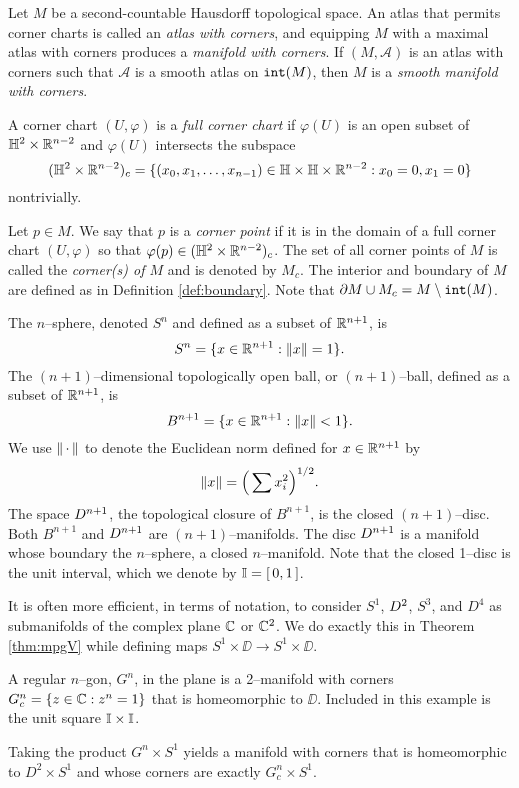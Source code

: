 \begin{defn}
	Let $M$ be a second-countable Hausdorff topological space.
	An atlas that permits corner charts is called an \emph{atlas with corners}, and equipping $M$ with a maximal atlas with corners produces a \emph{manifold with corners}.
	If $(M,\mathcal{A})$ is an atlas with corners such that $\mathcal{A}$ is a smooth atlas on $\mathtt{int}(M)$, then $M$ is a \emph{smooth manifold with corners}.
	
	A corner chart $(U,\varphi)$ is a \emph{full corner chart} if $\varphi(U)$ is an open subset of $\mathbb{H}^2\times\mathbb{R}^{n-2}$ and $\varphi(U)$ intersects the subspace 
	\[
		(\mathbb{H}^2\times\mathbb{R}^{n-2})_c = \{(x_0,x_1,\dots,x_{n-1})\in\mathbb{H}\times\mathbb{H}\times\mathbb{R}^{n-2}:x_0=0,x_1=0\}
	\]
	nontrivially.
	
	Let $p\in M$.
	We say that $p$ is a \emph{corner point} if it is in the domain of a full corner chart $(U,\varphi)$ so that $\varphi(p)\in(\mathbb{H}^2\times\mathbb{R}^{n-2})_c$.
	The set of all corner points of $M$ is called the \emph{corner(s) of $M$} and is denoted by $M_c$.
	The interior and boundary of $M$ are defined as in Definition \ref{def:boundary}.
	Note that $\partial M\cup M_c=M\setminus\mathtt{int}(M)$.
\end{defn}

\begin{ex}
	The $n$--sphere, denoted $S^n$ and defined as a subset of $\mathbb{R}^{n+1}$, is
	\[
	S^n = \{x\in\mathbb{R}^{n+1}:\left\lVert x \right\rVert=1\}.
	\]
	The $(n+1)$--dimensional topologically open ball, or $(n+1)$--ball, defined as a subset of $\mathbb{R}^{n+1}$, is
	\[
	B^{n+1} = \{x\in\mathbb{R}^{n+1}:\left\lVert x \right\rVert< 1\}.
	\]
	We use $\left\lVert \,\cdot\, \right\rVert$ to denote the Euclidean norm defined for $x\in\mathbb{R}^{n+1}$ by
	\[
	\left\lVert x \right\rVert = \Big( \sum x_i^2 \Big)^{1/2}.
	\]
	The space $D^{n+1}$, the topological closure of $B^{n+1}$, is the closed $(n+1)$--disc.
	Both $B^{n+1}$ and $D^{n+1}$ are $(n+1)$--manifolds.
	The disc $D^{n+1}$ is a manifold whose boundary the $n$--sphere, a closed $n$--manifold.
	Note that the closed 1--disc is the unit interval, which we denote by $\mathbb{I}=[\,0,1\,]$.
	
	It is often more efficient, in terms of notation, to consider $S^1$, $D^2$, $S^3$, and $D^4$ as submanifolds of the complex plane $\mathbb{C}$ or $\mathbb{C}^2$.
	We do exactly this in Theorem \ref{thm:mpgV} while defining maps $S^1\times\DD\to S^1\times\DD$.
\end{ex}

\begin{ex}
	A regular $n$--gon, $G^n$, in the plane is a 2--manifold with corners $G_c^n=\{z\in\mathbb{C}:z^n=1\}$ that is homeomorphic to $\DD$.
	Included in this example is the unit square $\mathbb{I}\times \mathbb{I}$.
	
	Taking the product $G^n\times S^1$ yields a manifold with corners that is homeomorphic to $D^2\times S^1$ and whose corners are exactly $G^n_c\times S^1$.	
\end{ex}


